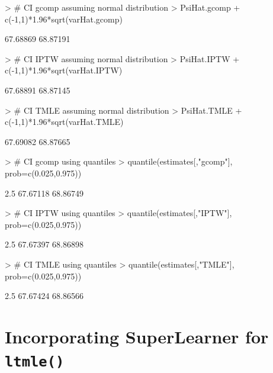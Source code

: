 \documentclass[answers]{exam}
\begin{document}
\begin{solution}
\begin{Schunk}
\end{Schunk}
\begin{Schunk}
\begin{Sinput}
> # CI gcomp assuming normal distribution
> PsiHat.gcomp + c(-1,1)*1.96*sqrt(varHat.gcomp)
\end{Sinput}
\begin{Soutput}
[1] 67.68869 68.87191
\end{Soutput}
\begin{Sinput}
> # CI IPTW assuming normal distribution
> PsiHat.IPTW + c(-1,1)*1.96*sqrt(varHat.IPTW)
\end{Sinput}
\begin{Soutput}
[1] 67.68891 68.87145
\end{Soutput}
\begin{Sinput}
> # CI TMLE assuming normal distribution
> PsiHat.TMLE + c(-1,1)*1.96*sqrt(varHat.TMLE)
\end{Sinput}
\begin{Soutput}
[1] 67.69082 68.87665
\end{Soutput}
\end{Schunk}
\begin{Schunk}
\begin{Sinput}
> # CI gcomp using quantiles
> quantile(estimates[,"gcomp"], prob=c(0.025,0.975))
\end{Sinput}
\begin{Soutput}
    2.5%
67.67118 68.86749 
\end{Soutput}
\begin{Sinput}
> # CI IPTW using quantiles
> quantile(estimates[,"IPTW"], prob=c(0.025,0.975))
\end{Sinput}
\begin{Soutput}
    2.5%
67.67397 68.86898 
\end{Soutput}
\begin{Sinput}
> # CI TMLE using quantiles
> quantile(estimates[,"TMLE"], prob=c(0.025,0.975))
\end{Sinput}
\begin{Soutput}
    2.5%
67.67424 68.86566 
\end{Soutput}
\end{Schunk}

\end{solution}

\section{Incorporating SuperLearner for \texttt{ltmle()}}
\end{document}
